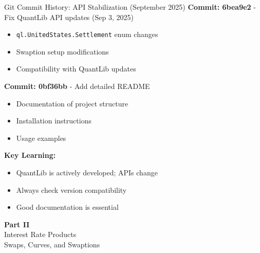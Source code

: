 \documentclass[aspectratio=169,11pt]{beamer}
\begin{document}
\begin{frame}{Git Commit History: API Stabilization (September 2025)}
\textbf{Commit: 6bea9e2} - Fix QuantLib API updates (Sep 3, 2025)
\begin{itemize}
    \item \texttt{ql.UnitedStates.Settlement} enum changes
    \item Swaption setup modifications
    \item Compatibility with QuantLib updates
\end{itemize}

\textbf{Commit: 0bf36bb} - Add detailed README
\begin{itemize}
    \item Documentation of project structure
    \item Installation instructions
    \item Usage examples
\end{itemize}

\vspace{0.5cm}
\textbf{Key Learning:}
\begin{itemize}
    \item QuantLib is actively developed; APIs change
    \item Always check version compatibility
    \item Good documentation is essential
\end{itemize}
\end{frame}


\begin{frame}{}
\begin{center}
\Huge\textbf{Part II}\\[1cm]
\Large Interest Rate Products\\[0.5cm]
\normalsize Swaps, Curves, and Swaptions
\end{center}
\end{frame}
\end{document}
